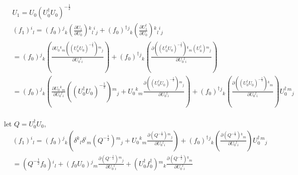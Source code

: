 \begin{equation}
\begin{split}
&U_1 = U_0\left(U_0^{\dagger}U_0\right)^{-\frac{1}{2}}\\
&(f_1){}^i{}_l = (f_0){}^j{}_k \left(\frac{\partial U_1}{\partial U_0}\right){}^k{}_l{}^i{}_j +  (f_0)^{\dagger}{}^j{}_k \left(\frac{\partial U_1^{\dagger}}{\partial U_0}\right){}^k{}_l{}^i{}_j\\
&=(f_0){}^j{}_k \left(\frac{\partial U_0 {}^k{}_m\left(\left(U_0^{\dagger}U_0\right)^{-\frac{1}{2}}\right){}^m{}_j}{\partial U_0 {}^l{}_i}\right) +  (f_0)^{\dagger}{}^j{}_k \left(\frac{\partial \left(\left(U_0^{\dagger}U_0\right)^{-\frac{1}{2}}\right){}^k{}_m (U_0^{\dagger}){}^m{}_j}{\partial U_0 {}^l{}_i}\right)\\
&=(f_0){}^j{}_k \left(\frac{\partial U_0 {}^k{}_m}{\partial U_0 {}^l{}_i}\left(\left(U_0^{\dagger}U_0\right)^{-\frac{1}{2}}\right){}^m{}_j+U_0 {}^k{}_m\frac{\partial \left(\left(U_0^{\dagger}U_0\right)^{-\frac{1}{2}}\right){}^m{}_j}{\partial U_0 {}^l{}_i}\right) +  (f_0)^{\dagger}{}^j{}_k \left(\frac{\partial \left(\left(U_0^{\dagger}U_0\right)^{-\frac{1}{2}}\right){}^k{}_m}{\partial U_0 {}^l{}_i}\right) U_0^{\dagger} {}^m{}_j\\
\end{split}
\end{equation}

let $Q=U_0^{\dagger}U_0$,
\begin{equation}
\begin{split}
&(f_1){}^i{}_l=(f_0){}^j{}_k \left(\delta{}^k{}_l\delta {}^i{}_m\left(Q^{-\frac{1}{2}}\right){}^m{}_j+U_0 {}^k{}_m\frac{\partial \left(Q^{-\frac{1}{2}}\right){}^m{}_j}{\partial U_0 {}^l{}_i}\right) +  (f_0)^{\dagger}{}^j{}_k \left(\frac{\partial \left(Q^{-\frac{1}{2}}\right){}^k{}_m}{\partial U_0 {}^l{}_i}\right)U_0^{\dagger} {}^m{}_j\\
&=\left(Q^{-\frac{1}{2}}f_0\right){}^i{}_l+\left(f_0U_0\right) {}^j{}_m\frac{\partial \left(Q^{-\frac{1}{2}}\right){}^m{}_j}{\partial U_0 {}^l{}_i} +  \left(U_0^{\dagger}f_0^{\dagger}\right) {}^m{}_k\frac{\partial \left(Q^{-\frac{1}{2}}\right){}^k{}_m}{\partial U_0 {}^l{}_i}\\
\end{split}
\end{equation}

